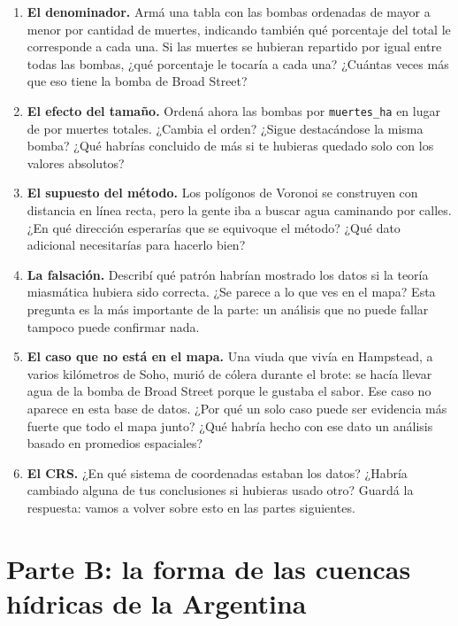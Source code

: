 \documentclass{article}
\begin{document}
\begin{enumerate}
    \item \textbf{El denominador.} Armá una tabla con las bombas ordenadas de mayor a menor por cantidad de muertes, indicando también qué porcentaje del total le corresponde a cada una. Si las muertes se hubieran repartido por igual entre todas las bombas, ¿qué porcentaje le tocaría a cada una? ¿Cuántas veces más que eso tiene la bomba de Broad Street?

    \item \textbf{El efecto del tamaño.} Ordená ahora las bombas por \texttt{muertes\_ha} en lugar de por muertes totales. ¿Cambia el orden? ¿Sigue destacándose la misma bomba? ¿Qué habrías concluido de más si te hubieras quedado solo con los valores absolutos?

    \item \textbf{El supuesto del método.} Los polígonos de Voronoi se construyen con distancia en línea recta, pero la gente iba a buscar agua caminando por calles. ¿En qué dirección esperarías que se equivoque el método? ¿Qué dato adicional necesitarías para hacerlo bien?

    \item \textbf{La falsación.} Describí qué patrón habrían mostrado los datos si la teoría miasmática hubiera sido correcta. ¿Se parece a lo que ves en el mapa? Esta pregunta es la más importante de la parte: un análisis que no puede fallar tampoco puede confirmar nada.

    \item \textbf{El caso que no está en el mapa.} Una viuda que vivía en Hampstead, a varios kilómetros de Soho, murió de cólera durante el brote: se hacía llevar agua de la bomba de Broad Street porque le gustaba el sabor. Ese caso no aparece en esta base de datos. ¿Por qué un solo caso puede ser evidencia más fuerte que todo el mapa junto? ¿Qué habría hecho con ese dato un análisis basado en promedios espaciales?

    \item \textbf{El CRS.} ¿En qué sistema de coordenadas estaban los datos? ¿Habría cambiado alguna de tus conclusiones si hubieras usado otro? Guardá la respuesta: vamos a volver sobre esto en las partes siguientes.
\end{enumerate}

\section{Parte B: la forma de las cuencas hídricas de la Argentina}
\end{document}
